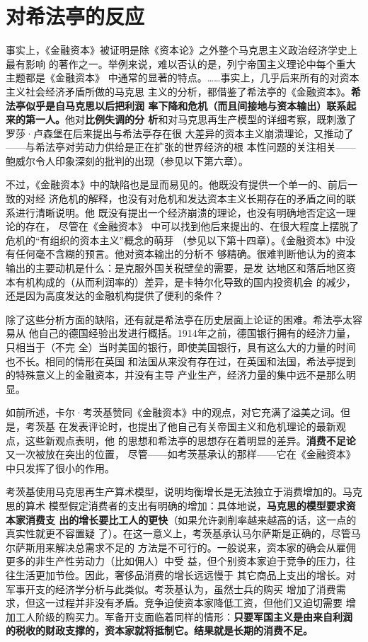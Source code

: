 \section{对希法亭的反应}

事实上，《金融资本》被证明是除《资本论》之外整个马克思主义政治经济学史上最有影响
的著作之一。举例来说，难以否认的是，列宁帝国主义理论中每个重大主题都是《金融资本》
中通常的显著的特点。……事实上，几乎后来所有的对资本主义社会经济矛盾所做的马克思
主义的分析，都借鉴了希法亭的《金融资本》。\textbf{希法亭似乎是自马克思以后把利润
  率下降和危机（而且间接地与资本输出）联系起来的第一人。}他对\textbf{比例失调的分
  析}和对马克思再生产模型的详细考察，既刺激了罗莎·卢森堡在后来提出与希法亭存在很
大差异的资本主义崩溃理论，又推动了——与希法亭对劳动力供给是正在扩张的世界经济的根
本性问题的关注相关——鲍威尔令人印象深刻的批判的出现（参见以下第六章）。

不过，《金融资本》中的缺陷也是显而易见的。他既没有提供一个单一的、前后一致的对经
济危机的解释，也没有对危机和发达资本主义长期存在的矛盾之间的联系进行清晰说明。他
既没有提出一个经济崩溃的理论，也没有明确地否定这一理论的存在， 尽管在《金融资本》
中可以找到他后来提出的、在很大程度上摆脱了危机的“有组织的资本主义”概念的萌芽
（参见以下第十四章）。《金融资本》中没有任何毫不含糊的预言。他对资本输出的分析不
够精确。很难判断他认为的资本输出的主要动机是什么：是克服外国关税壁垒的需要，是发
达地区和落后地区资本有机构成的（从而利润率的）差异，是卡特尔化导致的国内投资机会
的减少，还是因为高度发达的金融机构提供了便利的条件？

除了这些分析方面的缺陷，还有就是希法亭在历史层面上论证的困难。希法亭太容易从
他自己的德国经验出发进行概括。1914年之前，德国银行拥有的经济力量，只相当于（不完
全）当时美国的银行，即使美国银行，具有这么大的力量的时间也不长。相同的情形在英国
和法国从来没有存在过，在英国和法国，希法亭提到的特殊意义上的金融资本，并没有主导
产业生产，经济力量的集中远不是那么明显。

如前所述，卡尔·考茨基赞同《金融资本》中的观点，对它充满了溢美之词。但是，考茨基
在发表评论时，也提出了他自己有关帝国主义和危机理论的最新观点，这些新观点表明，他
的思想和希法亭的思想存在着明显的差异。\textbf{消费不足论}又一次被放在突出的位置，
尽管——如考茨基承认的那样——它在《金融资本》中只发挥了很小的作用。

考茨基使用马克思再生产算术模型，说明均衡增长是无法独立于消费增加的。马克思的算术
模型假定消费者的支出有明确的增加：具体地说，\textbf{马克思的模型要求资本家消费支
  出的增长要比工人的更快}（如果允许剥削率越来越高的话，这一点的真实性就更不容置疑
了）。在这一意义上，考茨基承认马尔萨斯是正确的，尽管马尔萨斯用来解决总需求不足的
方法是不可行的。一般说来，资本家的确会从雇佣更多的非生产性劳动力（比如佣人）中受
益，但个别资本家迫于竞争的压力，往往生活更加节俭。因此，奢侈品消费的增长远远慢于
其它商品上支出的增长。对军事开支的经济学分析与此类似。考茨基认为，虽然士兵的购买
增加了消费需求，但这一过程并非没有矛盾。竞争迫使资本家降低工资，但他们又迫切需要
增加工人阶级的购买力。军备开支面临着同样的情形：\textbf{只要军国主义是由来自利润
  的税收的财政支撑的，资本家就将抵制它。结果就是长期的消费不足。}

